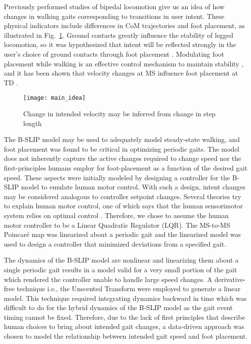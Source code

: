 Previously performed studies of bipedal locomotion give us an idea of how changes in walking gaits corresponding to transitions in user intent. These physical indicators include differences in CoM trajectories and foot placement, as illustrated in Fig.~\ref{fig:main_idea}. Ground contacts greatly influence the stability of legged locomotion, so it was hypothesized that intent will be reflected strongly in the user's choice of ground contacts through foot placement \cite{bhounsule2014foot}. Modulating foot placement while walking is an effective control mechanism to maintain stability \cite{hof2010balance,bhounsule2015control}, and it has been shown that velocity changes at MS influence foot placement at TD \cite{wang2014stepping,redfern1994model}. 

\begin{figure}
	\centering
	\texttt{[image: main\_idea]}
	\caption{Change in intended velocity may be inferred from change in step length}\label{fig:main_idea}
\end{figure}

The B-SLIP model may be used to adequately model steady-state walking, and foot placement was found to be critical in optimizing periodic gaits. The model does not inherently capture the active changes required to change speed nor the first-principles humans employ for foot-placement as a function of the desired gait speed. These aspects were initially modeled by designing a controller for the B-SLIP model to emulate human motor control. With such a design, intent changes may be considered analogous to controller setpoint changes. Several theories try to explain human motor control, one of which says that the human sensorimotor system relies on optimal control \cite{todorov2004optimality,sylla2014assessing}. Therefore, we chose to assume the human motor controller to be a Linear Quadratic Regulator (LQR). The MS-to-MS Poincar\'e map was linearized about a periodic gait and the linearized model was used to design a controller that minimized deviations from a specified gait. 

The dynamics of the B-SLIP model are nonlinear and linearizing them about a single periodic gait results in a model valid for a very small portion of the gait which rendered the controller unable to handle large speed changes. A derivative-free technique i.e., the Unscented Transform \cite{manchester2016derivative} were employed to generate a linear model. This technique required integrating dynamics backward in time which was difficult to do for the hybrid dynamics of the B-SLIP model as the gait event timing cannot be fixed. Therefore, due to the lack of first principles that describe human choices to bring about intended gait changes, a data-driven approach was chosen to model the relationship between intended gait speed and foot placement.

